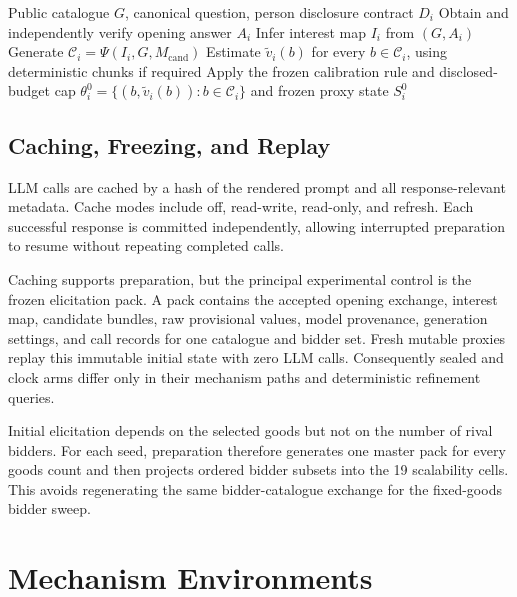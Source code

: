 \begin{algorithm}[htbp]
\caption{Natural-language disclosure to initial XOR bid}
\label{alg:initial-bid}
\begin{algorithmic}[1]
\Require Public catalogue \(G\), canonical question, person disclosure contract \(D_i\)
\State Obtain and independently verify opening answer \(A_i\)
\State Infer interest map \(I_i\) from \((G,A_i)\)
\State Generate \(\mathcal C_i=\Psi(I_i,G,M_{\mathrm{cand}})\)
\State Estimate \(\tilde v_i(b)\) for every \(b\in\mathcal C_i\), using deterministic chunks if required
\State Apply the frozen calibration rule and disclosed-budget cap
\State \Return \(\theta_i^0=\{(b,\tilde v_i(b)):b\in\mathcal C_i\}\) and frozen proxy state \(S_i^0\)
\end{algorithmic}
\end{algorithm}

\subsection{Caching, Freezing, and Replay}

LLM calls are cached by a hash of the rendered prompt and all
response-relevant metadata. Cache modes include off, read-write, read-only,
and refresh. Each successful response is committed independently, allowing
interrupted preparation to resume without repeating completed calls.

Caching supports preparation, but the principal experimental control is the
frozen elicitation pack. A pack contains the accepted opening exchange,
interest map, candidate bundles, raw provisional values, model provenance,
generation settings, and call records for one catalogue and bidder set.
Fresh mutable proxies replay this immutable initial state with zero LLM calls.
Consequently sealed and clock arms differ only in their mechanism paths and
deterministic refinement queries.

Initial elicitation depends on the selected goods but not on the number of
rival bidders. For each seed, preparation therefore generates one master pack
for every goods count and then projects ordered bidder subsets into the 19
scalability cells. This avoids regenerating the same bidder-catalogue exchange
for the fixed-goods bidder sweep.

\section{Mechanism Environments}

